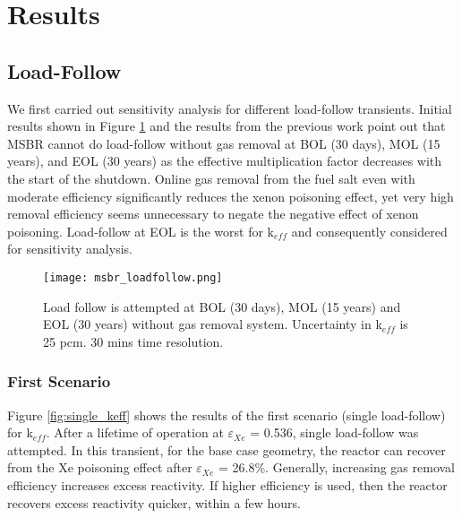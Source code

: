 \newpage
\FloatBarrier

\section{Results}

\subsection{Load-Follow}

    We first carried out sensitivity analysis for different load-follow 
    transients. Initial results shown in Figure \ref{fig:loadfollow} and the 
    results from the previous work \cite{rykhlevskii_fuel_2020} point out that 
    MSBR cannot do load-follow without gas removal at BOL (30 days), MOL (15 
    years), and EOL (30 years) as the effective multiplication factor decreases 
    with the start of the shutdown. Online gas removal from the fuel salt even 
    with moderate efficiency significantly reduces the xenon poisoning effect, 
    yet very high removal efficiency seems unnecessary to negate the negative 
    effect of xenon poisoning. Load-follow at EOL is the worst for k$_{eff}$ 
    and consequently considered for sensitivity analysis.

    \begin{figure}[h]
        \begin{center}
            \texttt{[image: msbr\_loadfollow.png]}
        \end{center}
        \caption{Load follow is attempted at BOL (30 days), MOL (15 years) and 
            EOL (30 years) without gas removal system. Uncertainty in k$_{eff}$ 
            is 25 pcm. 30 mins time resolution.}
        \label{fig:loadfollow}
    \end{figure}

\subsubsection{First Scenario}

    Figure \ref{fig:single_keff} shows the results of the first scenario 
    (single load-follow) for k$_{eff}$. After a lifetime of operation at 
    $\varepsilon$$_{Xe}$ = 0.536, single load-follow was attempted. In this 
    transient, for the base case geometry, the reactor can recover from the Xe 
    poisoning effect after $\varepsilon$$_{Xe}$ = 26.8\%. Generally, increasing 
    gas removal efficiency increases excess reactivity. If higher efficiency is 
    used, then the reactor recovers excess reactivity quicker, within a few 
    hours.

